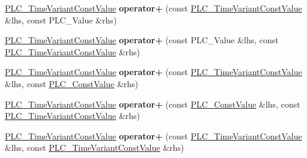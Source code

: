 \begin{DoxyCompactItemize}
\item 
\hypertarget{classns3_1_1PLC__TimeVariantConstValue_a9ab7203e9a54d88c3b3f31ee431d58bf}{\hyperlink{classns3_1_1PLC__TimeVariantConstValue}{\-P\-L\-C\-\_\-\-Time\-Variant\-Const\-Value} {\bfseries operator+} (const \hyperlink{classns3_1_1PLC__TimeVariantConstValue}{\-P\-L\-C\-\_\-\-Time\-Variant\-Const\-Value} \&lhs, const \-P\-L\-C\-\_\-\-Value \&rhs)}\label{classns3_1_1PLC__TimeVariantConstValue_a9ab7203e9a54d88c3b3f31ee431d58bf}

\item 
\hypertarget{classns3_1_1PLC__TimeVariantConstValue_a26cacf3740b7b986d62c6b24e418ed49}{\hyperlink{classns3_1_1PLC__TimeVariantConstValue}{\-P\-L\-C\-\_\-\-Time\-Variant\-Const\-Value} {\bfseries operator+} (const \-P\-L\-C\-\_\-\-Value \&lhs, const \hyperlink{classns3_1_1PLC__TimeVariantConstValue}{\-P\-L\-C\-\_\-\-Time\-Variant\-Const\-Value} \&rhs)}\label{classns3_1_1PLC__TimeVariantConstValue_a26cacf3740b7b986d62c6b24e418ed49}

\item 
\hypertarget{classns3_1_1PLC__TimeVariantConstValue_ae4b47b90ef801a627841b1121748ed8d}{\hyperlink{classns3_1_1PLC__TimeVariantConstValue}{\-P\-L\-C\-\_\-\-Time\-Variant\-Const\-Value} {\bfseries operator+} (const \hyperlink{classns3_1_1PLC__TimeVariantConstValue}{\-P\-L\-C\-\_\-\-Time\-Variant\-Const\-Value} \&lhs, const \hyperlink{classns3_1_1PLC__ConstValue}{\-P\-L\-C\-\_\-\-Const\-Value} \&rhs)}\label{classns3_1_1PLC__TimeVariantConstValue_ae4b47b90ef801a627841b1121748ed8d}

\item 
\hypertarget{classns3_1_1PLC__TimeVariantConstValue_a008728a9105a86f7264f1c96414d8127}{\hyperlink{classns3_1_1PLC__TimeVariantConstValue}{\-P\-L\-C\-\_\-\-Time\-Variant\-Const\-Value} {\bfseries operator+} (const \hyperlink{classns3_1_1PLC__ConstValue}{\-P\-L\-C\-\_\-\-Const\-Value} \&lhs, const \hyperlink{classns3_1_1PLC__TimeVariantConstValue}{\-P\-L\-C\-\_\-\-Time\-Variant\-Const\-Value} \&rhs)}\label{classns3_1_1PLC__TimeVariantConstValue_a008728a9105a86f7264f1c96414d8127}

\item 
\hypertarget{classns3_1_1PLC__TimeVariantConstValue_a02c4d0d0278e79435339d99e2e7fbd39}{\hyperlink{classns3_1_1PLC__TimeVariantConstValue}{\-P\-L\-C\-\_\-\-Time\-Variant\-Const\-Value} {\bfseries operator+} (const \hyperlink{classns3_1_1PLC__TimeVariantConstValue}{\-P\-L\-C\-\_\-\-Time\-Variant\-Const\-Value} \&lhs, const \hyperlink{classns3_1_1PLC__TimeVariantConstValue}{\-P\-L\-C\-\_\-\-Time\-Variant\-Const\-Value} \&rhs)}\label{classns3_1_1PLC__TimeVariantConstValue_a02c4d0d0278e79435339d99e2e7fbd39}


\end{DoxyCompactItemize}
